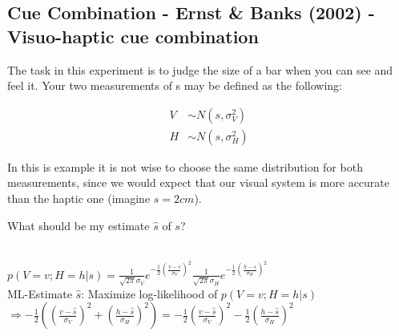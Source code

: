 \documentclass[../main/Notes.tex]{subfiles}
\begin{document}
\subsection{Cue Combination - Ernst \& Banks (2002) - Visuo-haptic cue combination}
The task in this experiment is to judge the size of a bar when you can see and feel it. Your two measurements of s may be defined as the following:

\begin{align*}
V &\sim N\left(s,\sigma_{V}^{2}\right)\\
H &\sim N\left(s,\sigma_{H}^{2}\right)
\end{align*}

In this is example it is not wise to choose the same distribution for both measurements, since we would expect that our visual system is more accurate than the haptic one (imagine $s=2cm$).
\begin{figure}[ht!]
\centering
{} 
\end{figure}



What should be my estimate $\hat{s}$ of $s$?
\\
$p\left(V=v;H=h|s\right)=\frac{1}{\sqrt{2\pi}\sigma_{V}}e^{-\frac{1}{2}\left(\frac{v-s}{\sigma_{V}}\right)^{2}}\frac{1}{\sqrt{2\pi}\sigma_{H}}e^{-\frac{1}{2}\left(\frac{h-s}{\sigma_{H}}\right)^{2}}$
\smallskip
\\
ML-Estimate $\hat{s}$: Maximize log-likelihood of $p\left(V=v;H=h|s\right)$
\smallskip
\\
$\Rightarrow -\frac{1}{2}\left(\left(\frac{v-\hat{s}}{\sigma_{V}}\right)^{2} + \left(\frac{h-\hat{s}}{\sigma_{H}}\right)^{2}\right) = -\frac{1}{2}\left(\frac{v-\hat{s}}{\sigma_{V}}\right)^{2} -\frac{1}{2} \left(\frac{h-\hat{s}}{\sigma_{H}}\right)^{2}$
\end{document}
